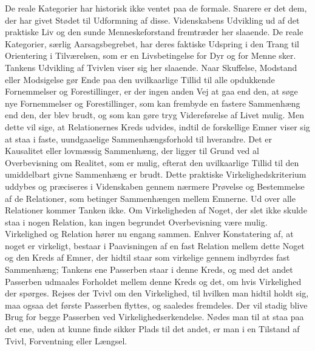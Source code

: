 \documentclass[12pt]{article}
\newcommand{\opage}[1]{\marginnote{\footnotesize\textit{[#1]}}}
\begin{document}
De reale Kategorier har historisk ikke ventet paa de formale. Snarere er
det dem, der har givet Stødet til Udformning af disse. Videnskabens
Udvikling ud af det praktiske Liv og den sunde Menneskeforstand
fremtræder her slaaende. De reale Kategorier, særlig Aarsagsbegrebet,
har deres faktiske Udspring i den Trang til Orientering i Tilværelsen,
som er en Livsbetingelse for Dyr og for Menne%
\opage{46}%
sker. Tankens Udvikling af Tvivlen viser sig her slaaende. Naar
Skuffelse, Modstand eller Modsigelse gør Ende paa den uvilkaarlige
Tillid til alle opdukkende Fornemmelser og Forestillinger, er der ingen
anden Vej at gaa end den, at søge nye Fornemmelser og Forestillinger,
som kan frembyde en fastere Sammenhæng end den, der blev brudt, og som
kan gøre tryg Videreførelse af Livet mulig. Men dette vil sige, at
Relationernes Kreds udvides, indtil de forskellige Emner viser sig at
staa i faste, uundgaaelige Sammenhængsforhold til hverandre. Det er
Kausalitet eller lovmæssig Sammenhæng, der ligger til Grund ved al
Overbevisning om Realitet, som er mulig, efterat den uvilkaarlige Tillid
til den umiddelbart givne Sammenhæng er brudt. Dette praktiske
Virkelighedskriterium uddybes og præciseres i Videnskaben gennem
nærmere Prøvelse og Bestemmelse af de Relationer, som betinger
Sammenhængen mellem Emnerne. Ud over alle Relationer kommer Tanken ikke.
Om Virkeligheden af Noget, der slet ikke skulde staa i nogen Relation,
kan ingen begrundet Overbevisning være mulig. Virkelighed og Relation
hører nu engang sammen. Enhver Konstatering af, at noget er virkeligt,
bestaar i Paavisningen af en fast Relation mellem dette Noget og den
Kreds af Emner, der hidtil staar som virkelige gennem indbyrdes fast
Sammenhæng; Tankens ene Passerben staar i denne Kreds, og med det andet
Passerben udmaales Forholdet mellem denne Kreds og det, om hvis
Virkelighed der spørges. Rejses der Tvivl om den Virkelighed, til
hvilken man hidtil holdt sig, maa ogsaa det første Passerben flyttes, og
saaledes fremdeles. Der vil stadig blive Brug for begge Passerben ved
Virkelighedserkendelse. Nødes man til at staa paa det ene, uden at kunne
finde sikker Plads til
\opage{47} \setcounter{footnote}{0}
det andet, er man i en Tilstand af Tvivl, Forventning eller
Længsel.%
\end{document}
